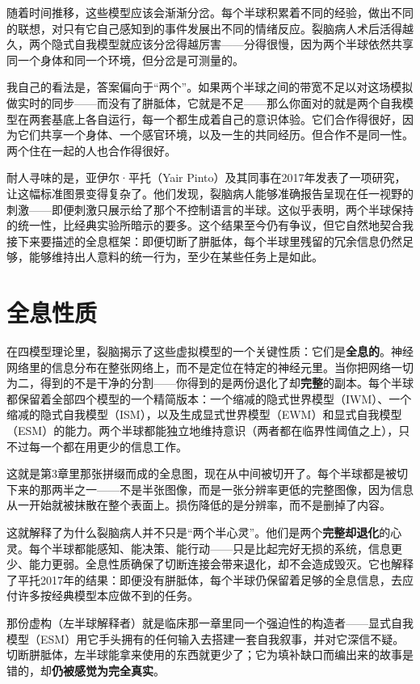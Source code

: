 \documentclass[11pt, twoside, openright]{book}
\begin{document}
随着时间推移，这些模型应该会渐渐分岔。每个半球积累着不同的经验，做出不同的联想，对只有它自己感知到的事件发展出不同的情绪反应。裂脑病人术后活得越久，两个隐式自我模型就应该分岔得越厉害------分得很慢，因为两个半球依然共享同一个身体和同一个环境，但分岔是可测量的。

我自己的看法是，答案偏向于“两个”。如果两个半球之间的带宽不足以对这场模拟做实时的同步------而没有了胼胝体，它就是不足------那么你面对的就是两个自我模型在两套基底上各自运行，每一个都生成着自己的意识体验。它们合作得很好，因为它们共享一个身体、一个感官环境，以及一生的共同经历。但合作不是同一性。两个住在一起的人也合作得很好。

耐人寻味的是，亚伊尔·平托（Yair Pinto）及其同事在2017年发表了一项研究，让这幅标准图景变得复杂了。他们发现，裂脑病人能够准确报告呈现在任一视野的刺激------即便刺激只展示给了那个不控制语言的半球。这似乎表明，两个半球保持的统一性，比经典实验所暗示的要多。这个结果至今仍有争议，但它自然地契合我接下来要描述的全息框架：即便切断了胼胝体，每个半球里残留的冗余信息仍然足够，能够维持出人意料的统一行为，至少在某些任务上是如此。

\section*{全息性质}

在四模型理论里，裂脑揭示了这些虚拟模型的一个关键性质：它们是\textbf{全息的}。神经网络里的信息分布在整张网络上，而不是定位在特定的神经元里。当你把网络一切为二，得到的不是干净的分割------你得到的是两份退化了却\textbf{完整}的副本。每个半球都保留着全部四个模型的一个精简版本：一个缩减的隐式世界模型（IWM）、一个缩减的隐式自我模型（ISM），以及生成显式世界模型（EWM）和显式自我模型（ESM）的能力。两个半球都能独立地维持意识（两者都在临界性阈值之上），只不过每一个都在用更少的信息工作。

这就是第3章里那张拼缀而成的全息图，现在从中间被切开了。每个半球都是被切下来的那两半之一------不是半张图像，而是一张分辨率更低的完整图像，因为信息从一开始就被抹散在整个表面上。损伤降低的是分辨率，而不是删掉了内容。

这就解释了为什么裂脑病人并不只是“两个半心灵”。他们是两个\textbf{完整却退化}的心灵。每个半球都能感知、能决策、能行动------只是比起完好无损的系统，信息更少、能力更弱。全息性质确保了切断连接会带来退化，却不会造成毁灭。它也解释了平托2017年的结果：即便没有胼胝体，每个半球仍保留着足够的全息信息，去应付许多按经典模型本应做不到的任务。

那份虚构（左半球解释者）就是临床那一章里同一个强迫性的构造者------显式自我模型（ESM）用它手头拥有的任何输入去搭建一套自我叙事，并对它深信不疑。切断胼胝体，左半球能拿来使用的东西就更少了；它为填补缺口而编出来的故事是错的，却\textbf{仍被感觉为完全真实}。
\end{document}
